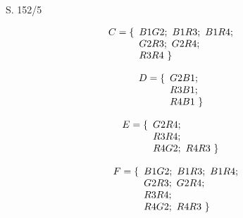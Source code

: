 \begin{Exercise}{S. 152/5}{}
\begin{enumerate}
\begin{enumerate}[label=\alph*),leftmargin=*]
{            \begin{minipage}[t]{0.40\linewidth}
                \begin{align*}
                C &= \{\begin{array}[t]{l}
                        B1G2; \ B1R3; \ B1R4; \\
                        G2R3; \ G2R4; \\
                        R3R4 \
                    \} \end{array}&&
                \end{align*}
            \end{minipage}
            \begin{minipage}[t]{0.25\linewidth}
                \begin{align*}
                D &= \{\begin{array}[t]{l}
                        G2B1; \\
                        R3B1; \\
                        R4B1 \
                    \} \end{array}&&
                \end{align*}
            \end{minipage}
            \begin{minipage}[t]{0.25\linewidth}
                \begin{align*}
                E &= \{\begin{array}[t]{l}
                        G2R4; \\
                        R3R4; \\
                        R4G2; \ R4R3 \
                    \} \end{array}&&
                \end{align*}
            \end{minipage}
            \begin{minipage}[t]{0.40\linewidth}
                \begin{align*}
                F &= \{\begin{array}[t]{l}
                        B1G2; \ B1R3; \ B1R4; \\
                        G2R3; \ G2R4; \\
                        R3R4; \\
                        R4G2; \ R4R3 \
                    \} \end{array}&&\\[-1.5ex]
                \end{align*}

\end{minipage}}
\end{enumerate}
\end{enumerate}
\end{Exercise}
